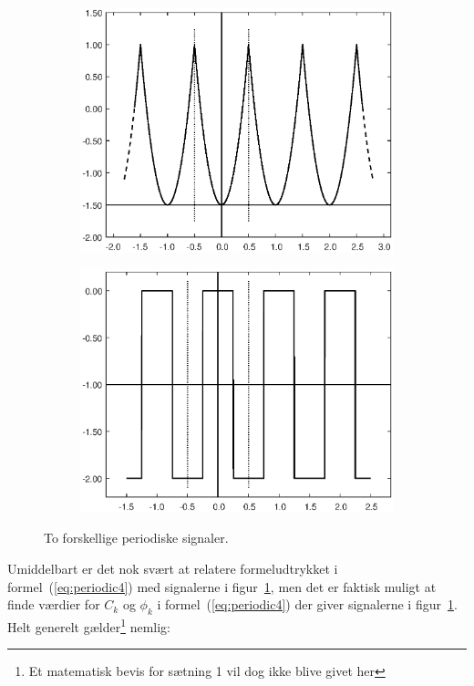 \documentclass[11pt,a4paper]{article}
\begin{document}
\begin{figure}[htbp]
\centering
\begin{subfigure}{0.48\textwidth}
\includegraphics[scale=0.5]{squared1}
\end{subfigure}
\begin{subfigure}{0.48\textwidth}
\includegraphics[scale=0.5]{squared2}
\end{subfigure}
\caption{\label{fig:squareperiodic}To forskellige periodiske signaler.}
\end{figure}

Umiddelbart er det nok svært at relatere formeludtrykket i formel~(\ref{eq:periodic4}) med signalerne i figur~\ref{fig:squareperiodic}, men det er faktisk muligt at finde værdier for $C_{k}$ og $\phi_{k}$ i formel~(\ref{eq:periodic4}) der giver signalerne i figur~\ref{fig:squareperiodic}. Helt generelt gælder\footnote{Et matematisk bevis for sætning 1 vil dog ikke blive givet her} nemlig:
\end{document}
